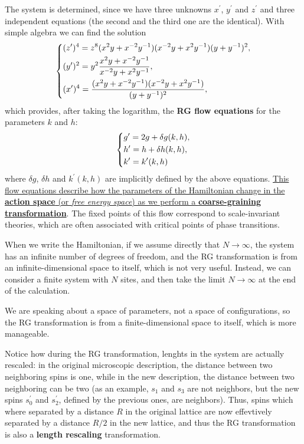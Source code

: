 The system is determined, since we have three unknowns \(x^{\prime}\), \(y^{\prime}\) and \(z^{\prime}\) and three independent equations (the second and the third one are the identical). With simple algebra we can find the solution
\[
    \begin{dcases}
        (z^{\prime})^4 = z^8 (x^2 y + x^{-2} y^{-1})(x^{-2} y + x^{2} y^{-1}) (y + y^{-1})^2, \\
        (y^{\prime})^2 = y^2 \frac{x^2 y + x^{-2} y^{-1}}{x^{-2} y + x^{2} y^{-1}},           \\
        (x^{\prime})^4 = \frac{(x^2 y + x^{-2} y^{-1})(x^{-2} y + x^{2} y^{-1})}{(y + y^{-1})^2},
    \end{dcases}
\]
which provides, after taking the logarithm, the \textbf{RG flow equations} for the parameters \(k\) and \(h\):
\[
    \begin{dcases}
        g^{\prime} = 2g + \delta g(k, h), \\
        h^{\prime} = h + \delta h(k, h),  \\
        k^{\prime} = k^{\prime} (k, h)
    \end{dcases}
\]
where \(\delta g\), \(\delta h\) and \(k^{\prime} (k, h)\) are implicitly defined by the above equations. \uline{This flow equations describe how the parameters of the Hamiltonian change in the \textbf{action space} (or \textit{free energy space}) as we perform a \textbf{coarse-graining transformation}}. The fixed points of this flow correspond to scale-invariant theories, which are often associated with critical points of phase transitions.

\begin{remark}
    When we write the Hamiltonian, if we assume directly that \(N \to \infty\), the system has an infinite number of degrees of freedom, and the RG transformation is from an infinite-dimensional space to itself, which is not very useful. Instead, we can consider a finite system with \(N\) sites, and then take the limit \(N \to \infty\) at the end of the calculation.

    We are speaking about a space of parameters, not a space of configurations, so the RG transformation is from a finite-dimensional space to itself, which is more manageable.
\end{remark}

Notice how during the RG transformation, lenghts in the system are actually rescaled: in the original microscopic description, the distance between two neighboring spins is one, while in the new description, the distance between two neighboring can be two (as an example, \(s_1\) and \(s_3\) are not neighbors, but the new spins \(s_0^{\prime}\) and \(s_2^{\prime}\), defined by the previous ones, are neighbors). Thus, spins which where separated by a distance \(R\) in the original lattice are now effevtively separated by a distance \(R/2\) in the new lattice, and thus the RG transformation is also a \textbf{length rescaling} transformation.

